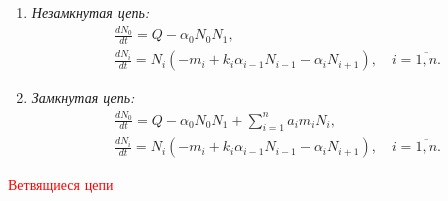     \begin{enumerate}[label={\asbuk*)}, ref=\asbuk*]
        \item \textit{Незамкнутая цепь:}
        \begin{equation}  \label{flow}
            \begin{split}
                & \frac{dN_0}{dt} = Q - \alpha_0 N_0 N_1, \\
                & \frac{dN_i}{dt} = N_i (-m_i + k_i \alpha_{i-1} N_{i-1}  - \alpha_i N_{i+1}), \quad i=\overline{1,n}.
            \end{split}
        \end{equation}

        \item \textit{Замкнутая цепь:}
        \begin{equation} \label{cycle}
            \begin{split}
                & \frac{dN_0}{dt} = Q - \alpha_0 N_0 N_1  + \sum_{i=1}^{n} a_i m_i N_i, \\
                & \frac{dN_i}{dt} = N_i (-m_i + k_i \alpha_{i-1} N_{i-1}  - \alpha_i N_{i+1}), \quad i=\overline{1,n}.
            \end{split}
        \end{equation}
    \end{enumerate}

    \textcolor{red}{Ветвящиеся цепи}